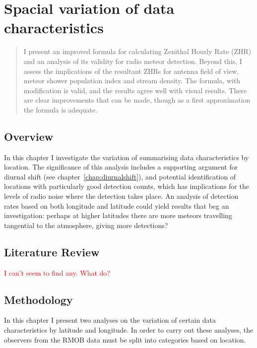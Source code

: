 \chapter{Spacial variation of data characteristics}
\label{chap:spacial}
\begin{strip}
	\begin{minipage}{\textwidth}
		\begin{abstract}
			I present an improved formula for calculating Zenithal Hourly Rate (ZHR) and an analysis of its validity for radio meteor detection. Beyond this, I assess the implications of the resultant ZHRs for antenna field of view, meteor shower population index and stream density. The formula, with modification is valid, and the results agree well with visual results. There are clear improvements that can be made, though as a first approximation the formula is adequate.
		\end{abstract}
	\end{minipage}
\end{strip}
\section{Overview}
In this chapter I investigate the variation of summarising data characteristics by location. The significance of this analysis includes a supporting argument for diurnal shift (see chapter~\ref{chap:diurnalshift}), and potential identification of locations with particularly good detection counts, which has implications for the levels of radio noise where the detection takes place. An analysis of detection rates based on both longitude and latitude could yield results that beg an investigation: perhaps at higher latitudes there are more meteors travelling tangential to the atmosphere, giving more detections?
\section{Literature Review}
\textcolor{red}{I can't seem to find any. What do?}
\section{Methodology}
In this chapter I present two analyses on the variation of certain data characteristics by latitude and longitude. In order to carry out these analyses, the observers from the RMOB data must be split into categories based on location.

